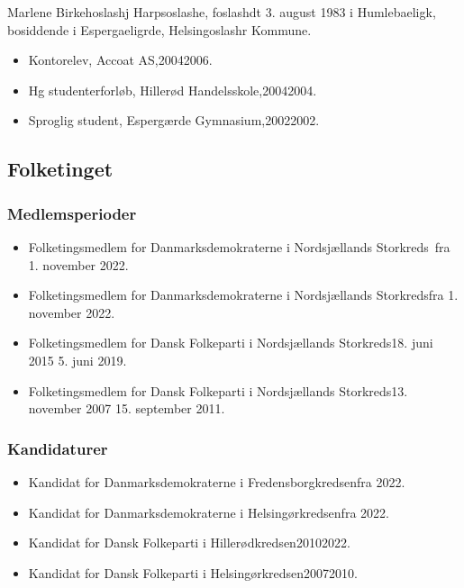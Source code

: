 \documentclass[11pt, a4paper]{awesome-cv}
\begin{document}
\makecvheader[R]
\makelettertitle
\begin{cvletter}
Marlene Birkehoslashj Harpsoslashe, foslashdt 3. august 1983 i Humlebaeligk, bosiddende i Espergaeligrde, Helsingoslashr Kommune.

\begin{itemize}
\item Kontorelev, Accoat AS,20042006.
\item Hg studenterforløb, Hillerød Handelsskole,20042004.
\item Sproglig student, Espergærde Gymnasium,20022002.
\end{itemize}
\subsection*{Folketinget}
\subsubsection*{Medlemsperioder}
\begin{itemize}
\item Folketingsmedlem for Danmarksdemokraterne i Nordsjællands Storkreds fra 1. november 2022.
\item Folketingsmedlem for Danmarksdemokraterne i Nordsjællands Storkredsfra 1. november 2022.
\item Folketingsmedlem for Dansk Folkeparti i Nordsjællands Storkreds18. juni 2015  5. juni 2019.
\item Folketingsmedlem for Dansk Folkeparti i Nordsjællands Storkreds13. november 2007  15. september 2011.
\end{itemize}
\subsubsection*{Kandidaturer}
\begin{itemize}
\item Kandidat for Danmarksdemokraterne i Fredensborgkredsenfra 2022.
\item Kandidat for Danmarksdemokraterne i Helsingørkredsenfra 2022.
\item Kandidat for Dansk Folkeparti i Hillerødkredsen20102022.
\item Kandidat for Dansk Folkeparti i Helsingørkredsen20072010.
\end{itemize}
\end{cvletter}
\end{document}
